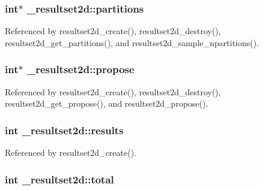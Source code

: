 \subsubsection[{\texorpdfstring{partitions}{partitions}}]{\setlength{\rightskip}{0pt plus 5cm}int$\ast$ \+\_\+resultset2d\+::partitions}\hypertarget{struct__resultset2d_a7e653d18c276f644dd5466a812818cf2}{}\label{struct__resultset2d_a7e653d18c276f644dd5466a812818cf2}


Referenced by resultset2d\+\_\+create(), resultset2d\+\_\+destroy(), resultset2d\+\_\+get\+\_\+partitions(), and resultset2d\+\_\+sample\+\_\+npartitions().

\subsubsection[{\texorpdfstring{propose}{propose}}]{\setlength{\rightskip}{0pt plus 5cm}int$\ast$ \+\_\+resultset2d\+::propose}\hypertarget{struct__resultset2d_a6cf5a6140d366ba6ffb3e391208b660d}{}\label{struct__resultset2d_a6cf5a6140d366ba6ffb3e391208b660d}


Referenced by resultset2d\+\_\+create(), resultset2d\+\_\+destroy(), resultset2d\+\_\+get\+\_\+propose(), and resultset2d\+\_\+propose().

\subsubsection[{\texorpdfstring{results}{results}}]{\setlength{\rightskip}{0pt plus 5cm}int \+\_\+resultset2d\+::results}\hypertarget{struct__resultset2d_a0a5f3d334a6c3c77d5cd6a14a6fe42d5}{}\label{struct__resultset2d_a0a5f3d334a6c3c77d5cd6a14a6fe42d5}


Referenced by resultset2d\+\_\+create().

\subsubsection[{\texorpdfstring{total}{total}}]{\setlength{\rightskip}{0pt plus 5cm}int \+\_\+resultset2d\+::total}\hypertarget{struct__resultset2d_a84ce623b8cf152f0705d8f5481e7d7ab}{}\label{struct__resultset2d_a84ce623b8cf152f0705d8f5481e7d7ab}


